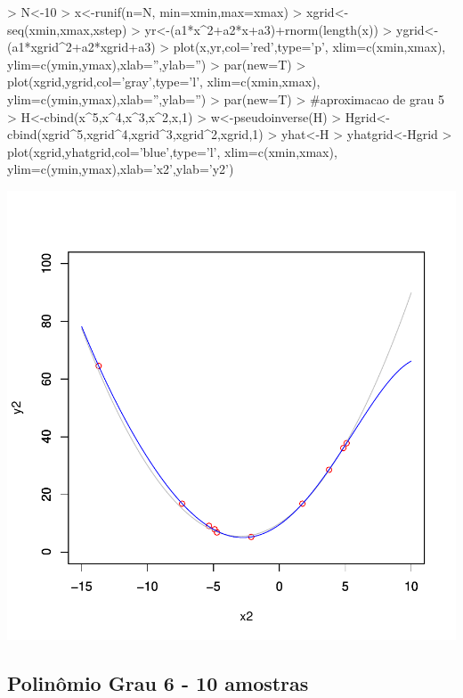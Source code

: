 \documentclass{article}
\begin{document}
\begin{Schunk}
\begin{Sinput}
>   N<-10
>   x<-runif(n=N, min=xmin,max=xmax)
>   xgrid<-seq(xmin,xmax,xstep)
>   yr<-(a1*x^2+a2*x+a3)+rnorm(length(x))
>   ygrid<-(a1*xgrid^2+a2*xgrid+a3)
>   plot(x,yr,col='red',type='p', xlim=c(xmin,xmax), ylim=c(ymin,ymax),xlab='',ylab='')
>   par(new=T)
>   plot(xgrid,ygrid,col='gray',type='l', xlim=c(xmin,xmax), ylim=c(ymin,ymax),xlab='',ylab='')
>   par(new=T)
>   #aproximacao de grau 5
>   H<-cbind(x^5,x^4,x^3,x^2,x,1)
>   w<-pseudoinverse(H) %
>   Hgrid<-cbind(xgrid^5,xgrid^4,xgrid^3,xgrid^2,xgrid,1)
>   yhat<-H%
>   yhatgrid<-Hgrid%
>   plot(xgrid,yhatgrid,col='blue',type='l', xlim=c(xmin,xmax), ylim=c(ymin,ymax),xlab='x2',ylab='y2')
\end{Sinput}
\end{Schunk}
\includegraphics{aproximacao_polinomial-006}

\newpage
\subsection{Polinômio Grau 6 - 10 amostras}
\end{document}
